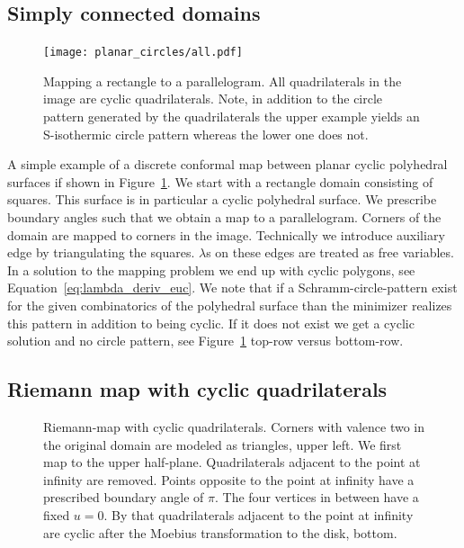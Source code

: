 \documentclass[Thesis]{subfiles}
\begin{document}
\subsection{Simply connected domains}

\begin{figure}
\centering
\texttt{[image: planar\_circles/all.pdf]}
\\
\caption{
Mapping a rectangle to a parallelogram.
All quadrilaterals in the image are cyclic quadrilaterals.
Note, in addition to the circle pattern generated by the quadrilaterals the upper example yields an S-isothermic circle pattern whereas the lower one does not.
}
\label{fig:cyclic_parallelogram}
\end{figure}

A simple example of a discrete conformal map between planar cyclic polyhedral surfaces if shown in 
Figure~\ref{fig:cyclic_parallelogram}. We start with a rectangle domain consisting of squares. This surface 
is in particular a cyclic polyhedral surface. We prescribe boundary angles such that we obtain a map to a 
parallelogram. Corners of the domain are mapped to corners in the image.
Technically we introduce auxiliary edge by triangulating the squares. $\lambda$s on these edges are treated
as free variables. In a solution to the mapping problem we end up with cyclic polygons, see Equation~\ref{eq:lambda_deriv_euc}.
We note that if a Schramm-circle-pattern \cite{S97} exist for the given combinatorics of the polyhedral surface than
the minimizer realizes this pattern in addition to being cyclic. 
If it does not exist we get a cyclic solution and no circle pattern, see Figure~\ref{fig:cyclic_parallelogram}
top-row versus bottom-row.


\subsection{Riemann map with cyclic quadrilaterals}

\begin{figure}
\centering
{}
\caption{
Riemann-map with cyclic quadrilaterals.
Corners with valence two in the original domain are modeled as triangles, upper left.
We first map to the upper half-plane.
Quadrilaterals adjacent to the point at infinity are removed.
Points opposite to the point at infinity have a prescribed boundary angle of $\pi$.
The four vertices in between have a fixed $u=0$.
By that quadrilaterals adjacent to the point at infinity are cyclic after the Moebius transformation to the disk, bottom.
}
\label{fig:circular_riemann}
\end{figure}
\end{document}
